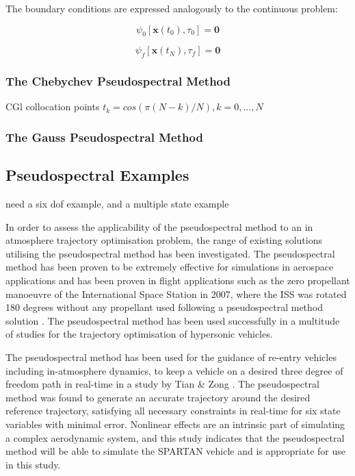 The boundary conditions are expressed analogously to the continuous problem:

\begin{equation}
\psi_0[\textbf{x}(t_0), \tau_0] = \textbf{0}
\end{equation}

\begin{equation}
\psi_f[\textbf{x}(t_N), \tau_f] = \textbf{0}
\end{equation}


\subsubsection{The Chebychev Pseudospectral Method}

CGl collocation points \cite{Gong2010}
$t_k = cos(\pi (N-k)/N), k=0,...,N$



\subsubsection{The Gauss Pseudospectral Method}



\subsection{Pseudospectral Examples}

need a six dof example, and a multiple state example

In order to assess the applicability of the pseudospectral method to an in atmosphere trajectory optimisation problem, the range of existing solutions utilising the pseudospectral method has been investigated. 
The pseudospectral method has been proven to be extremely effective for simulations in aerospace applications and has been proven in flight applications such as the zero propellant manoeuvre of the International Space Station in 2007, where the ISS was rotated 180 degrees without any propellant used following a pseudospectral method solution \cite{Bedrossian}. 
The pseudospectral method has been used successfully in a multitude of studies for the trajectory optimisation of hypersonic vehicles\cite{Li2012,Josselyn2002a,Zhao2013,Tian2011,Darby2011,Chai2015,Rizvi2015,Moshman2014}. 

 The pseudospectral method has been used for the guidance of re-entry vehicles including in-atmosphere dynamics, to keep a vehicle on a desired three degree of freedom path in real-time in a study by Tian \& Zong \cite{Tian2011}. The pseudospectral method was found to generate an accurate trajectory around the desired reference trajectory, satisfying all necessary constraints in real-time for six state variables with minimal error.  Nonlinear effects are an intrinsic part of simulating a complex aerodynamic system, and this study indicates that the pseudospectral method will be able to simulate the SPARTAN vehicle and is appropriate for use in this study.
 

